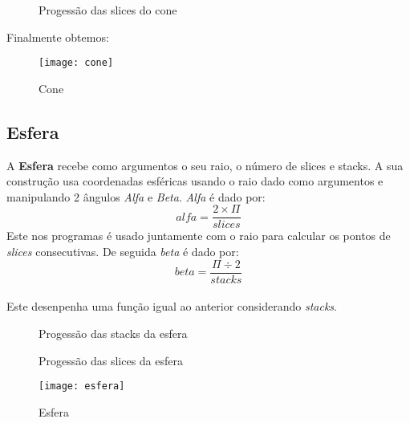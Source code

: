 \documentclass{article}
\begin{document}
\begin{figure}[H]
	\centering
	\hspace{2cm}
	\caption{Progessão das slices do cone}
\end{figure}

Finalmente obtemos:

\begin{figure}[H]
	\centering
	\texttt{[image: cone]}
	\caption{Cone}
\end{figure}

\subsection{Esfera}
A \textbf{Esfera} recebe como argumentos o seu raio, o número de slices e stacks.
A sua construção usa coordenadas esféricas usando o raio dado como argumentos e manipulando 2 ângulos \textit{Alfa} e \textit{Beta}. \textit{Alfa} é dado por: \\
\[ alfa = \frac{2\times \Pi}{slices} \]
Este nos programas é usado juntamente com o raio para calcular os pontos de \textit{slices} consecutivas. De seguida \textit{beta} é dado por:\\
\[ beta = \frac{\Pi \div 2}{stacks}\] \\
Este desenpenha uma função igual ao anterior considerando \textit{stacks}.\\


\begin{figure}[H]
	\centering
	\hspace{2cm}
	\caption{Progessão das stacks da esfera}
\end{figure}

\begin{figure}[H]
	\centering
	\hspace{2cm}
	\caption{Progessão das slices da esfera}
\end{figure}

\begin{figure}[H]
	\centering
	\texttt{[image: esfera]}
	\caption{Esfera}
\end{figure}
\end{document}

